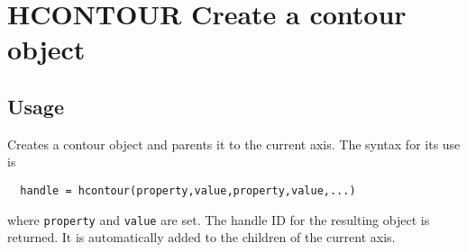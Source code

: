 \section{HCONTOUR Create a contour object}

\subsection{Usage}

Creates a contour object and parents it to the current axis.  The
syntax for its use is 
\begin{verbatim}
  handle = hcontour(property,value,property,value,...)
\end{verbatim}
where \verb|property| and \verb|value| are set.  The handle ID for the
resulting object is returned.  It is automatically added to
the children of the current axis.
